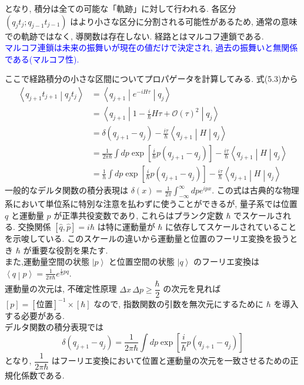 \documentclass[a4paper,12pt]{article}
\newcommand{\ket}[1]{\left|#1\right\rangle}
\newcommand{\braket}[2]{\left\langle #1\middle|#2\right\rangle}
\newcommand{\brakets}[3]{\left\langle #1\middle| #2 \middle|#3 \right\rangle}
\begin{document}
となり, 積分は全ての可能な「軌跡」に対して行われる. 各区分 $(q_{j}t_{j}; q_{j-1}t_{j-1})$ はより小さな区分に分割される可能性があるため, 通常の意味での軌跡ではなく, 導関数は存在しない. 経路とはマルコフ連鎖である.\\
\textcolor{blue}{マルコフ連鎖は未来の振舞いが現在の値だけで決定され, 過去の振舞いと無関係である(マルコフ性).}\par
ここで経路積分の小さな区間についてプロパゲータを計算してみる. 式(5.3)から
\begin{align*}
    \braket{q_{j+1}t_{j+1}}{q_{j}t_{j}} &= \brakets{q_{j+1}}{e^{-iH\tau}}{q_{j}}\\
    &= \brakets{q_{j+1}}{1 - \frac{i}{\hbar}H\tau + \mathcal{O}(\tau)^{2}}{q_{j}}\\
    &= \delta(q_{j+1} - q_{j}) - \frac{i\tau}{\hbar}\brakets{q_{j+1}}{H}{q_{j}}\\
    &= \frac{1}{2\pi\hbar}\int dp \exp\left[ \frac{i}{\hbar}p(q_{j+1} - q_{j}) \right] - \frac{i\tau}{\hbar}\brakets{q_{j+1}}{H}{q_{j}} \tag{5.7}\\
    &= \frac{1}{h}\int dp \exp\left[ \frac{i}{\hbar}p(q_{j+1} - q_{j}) \right] - \frac{i\tau}{\hbar}\brakets{q_{j+1}}{H}{q_{j}}
\end{align*}
\color{blue}
一般的なデルタ関数の積分表現は $\displaystyle \delta(x) = \frac{1}{2\pi}\int_{-\infty}^{\infty}dp e^{ipx}$. この式は古典的な物理系において単位系に特別な注意を払わずに使うことができるが, 量子系では位置 $q$ と運動量 $p$ が正準共役変数であり, これらはプランク定数 $\hbar$ でスケールされる. 交換関係 $[\hat{q}, \hat{p}] = i\hbar$ は特に運動量が $\hbar$ に依存してスケールされていることを示唆している. このスケールの違いから運動量と位置のフーリエ変換を扱うとき $\hbar$ が重要な役割を果たす.\\
また,運動量空間の状態 $\ket{p}$ と位置空間の状態 $\ket{q}$ のフーリエ変換は $\displaystyle \braket{q}{p} = \frac{1}{2\pi\hbar}e^{\frac{i}{\hbar}pq}$. \\
運動量の次元は, 不確定性原理 $\Delta x\,\Delta p \geq \dfrac{\hbar}{2}$ の次元を見れば $[p] = [\textrm{位置}]^{-1} \times [\hbar]$ なので, 指数関数の引数を無次元にするために $\hbar$ を導入する必要がある.\\
デルタ関数の積分表現では
\begin{equation*}
    \delta(q_{j+1} - q_{j}) = \frac{1}{2\pi\hbar}\int dp \exp\left[ \frac{i}{\hbar}p(q_{j+1} - q_{j}) \right]
\end{equation*}
となり, $\dfrac{1}{2\pi\hbar}$ はフーリエ変換において位置と運動量の次元を一致させるための正規化係数である. \\
\end{document}
